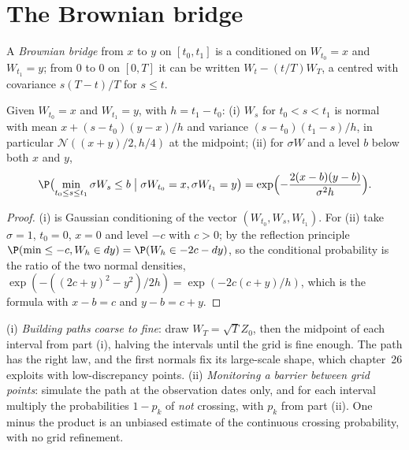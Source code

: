 \section{The Brownian bridge}\label{sec:qm:brownian-motion:bridge}

\begin{definition}\label{def:qm:brownian-motion:bridge}
A \emph{Brownian bridge} from $x$ to $y$ on $[t_0, t_1]$ is a  conditioned on $W_{t_0} = x$ and $W_{t_1} = y$; from $0$ to $0$ on $[0, T]$ it can be
written $W_t - (t/T)W_T$, a centred  with covariance $s(T - t)/T$ for $s \le t$.
\end{definition}

\begin{proposition}\label{prop:qm:brownian-motion:between}
Given $W_{t_0} = x$ and $W_{t_1} = y$, with $h = t_1 - t_0$: (i) $W_s$ for $t_0 < s < t_1$ is
normal with mean $x + (s - t_0)(y - x)/h$ and variance $(s - t_0)(t_1 - s)/h$, in particular
$\mathcal N((x+y)/2, h/4)$ at the midpoint; (ii) for $\sigma W$ and a level $b$ below both $x$
and $y$,
\[
\P\bigl(\min_{t_0 \le s \le t_1}\sigma W_s \le b \bigm| \sigma W_{t_0} = x, \sigma W_{t_1} = y\bigr) =
\exp\Bigl(-\frac{2(x - b)(y - b)}{\sigma^2 h}\Bigr).
\]
\end{proposition}

\begin{proof}
(i) is Gaussian conditioning of the vector $(W_{t_0}, W_s, W_{t_1})$. For (ii) take $\sigma = 1$,
$t_0 = 0$, $x = 0$ and level $-c$ with $c > 0$; by the reflection principle $\P(\min \le -c, W_h
\in dy) = \P(W_h \in -2c - dy)$, so the conditional probability is the ratio of the two normal
densities, $\exp(-((2c + y)^2 - y^2)/2h) = \exp(-2c(c + y)/h)$, which is the formula with $x - b
= c$ and $y - b = c + y$.
\end{proof}

\begin{method}\label{met:qm:brownian-motion:bridge}
(i) \emph{Building paths coarse to fine}: draw $W_T = \sqrt T Z_0$, then the midpoint of each
interval from part (i), halving the intervals until the grid is fine enough. The path has the
right law, and the first normals fix its large-scale shape, which chapter~26 exploits with
low-discrepancy points. (ii) \emph{Monitoring a barrier between grid points}: simulate the path
at the observation dates only, and for each interval multiply the probabilities $1 - p_k$ of
\emph{not} crossing, with $p_k$ from part (ii). One minus the product is an unbiased estimate of
the continuous crossing probability, with no grid refinement.
\end{method}

